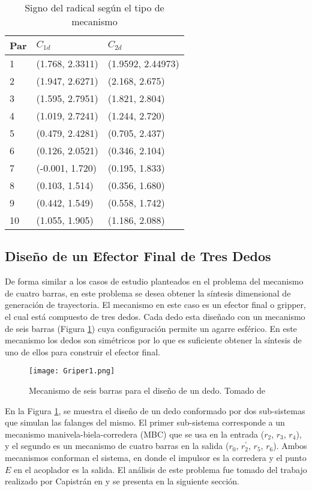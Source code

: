 \begin{table}[]
\centering
\begin{tabular}{|l|l|l|} 
\hline
\textbf{Par}& $C_{1d}$& $C_{2d}$  \\ \hline
1&  (1.768, 2.3311) &  (1.9592, 2.44973) \\ \hline
2& (1.947, 2.6271) & (2.168, 2.675)\\ \hline
3& (1.595, 2.7951) &(1.821, 2.804)\\ \hline
4& (1.019, 2.7241) &(1.244, 2.720)\\ \hline
5 &(0.479, 2.4281) &(0.705, 2.437)\\ \hline
6 &(0.126, 2.0521) &(0.346, 2.104)\\ \hline
7 &(-0.001, 1.720) &(0.195, 1.833)\\ \hline
8 &(0.103, 1.514) &(0.356, 1.680)\\ \hline
9 &(0.442, 1.549) &(0.558, 1.742)\\ \hline
10& (1.055, 1.905)& (1.186, 2.088)\\ \hline
\end{tabular}
\caption{Signo del radical según el tipo de mecanismo}
\label{tab:Coordenadas MEC3}
\end{table}
\subsection{Diseño de un Efector Final de Tres Dedos}
De forma similar a los casos de estudio planteados en el problema del mecanismo de cuatro barras, en este problema se desea obtener la síntesis dimensional de generación de trayectoria. El mecanismo en este caso es un efector final o gripper, el cual está compuesto de tres dedos. Cada dedo esta diseñado con un mecanismo de seis barras (Figura \ref{fig:Griper}) cuya configuración permite un agarre esférico. En este mecanismo los dedos son simétricos por lo que es suficiente obtener la síntesis de uno de ellos para construir el efector final.
\begin{figure}[htb]
    \centering
     \texttt{[image: Griper1.png]}
    \caption [Mecanismo de seis barras para el diseño de un dedo.]{Mecanismo de seis barras para el diseño de un dedo. Tomado de \cite{zapata_zapata_control_2017} }
    \label{fig:Griper}
\end{figure}

En la Figura \ref{fig:Griper}, se muestra el diseño de un dedo conformado por dos sub-sistemas que simulan las falanges del mismo. El primer sub-sistema corresponde a un mecanismo manivela-biela-corredera (MBC) que se usa en la entrada ($r_2$, $r_3$, $r_4$), y el segundo es un mecanismo de cuatro barras en la salida ($r_0$, $r^{\prime}_2$, $r_5$, $r_6$). Ambos mecanismos conforman el sistema, en donde el impulsor es la corredera y el punto $E$ en el acoplador es la salida. El análisis de este problema fue tomado del trabajo realizado por Capistrán en \cite{capistran_2015} y se presenta en la siguiente sección.


